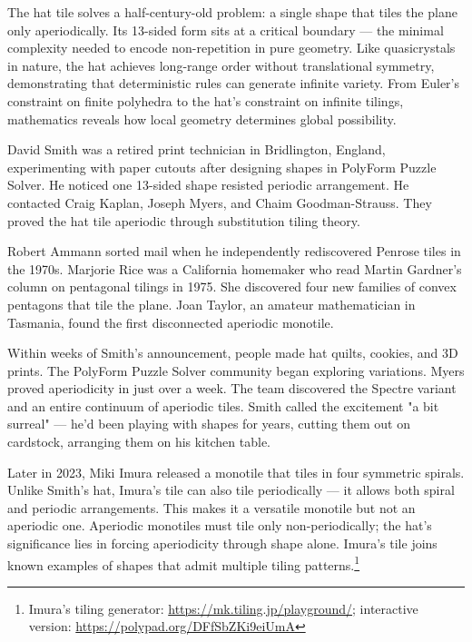 The hat tile solves a half-century-old problem: a single shape that tiles the plane only aperiodically. Its 13-sided form sits at a critical boundary — the minimal complexity needed to encode non-repetition in pure geometry. Like quasicrystals in nature, the hat achieves long-range order without translational symmetry, demonstrating that deterministic rules can generate infinite variety. From Euler's constraint on finite polyhedra to the hat's constraint on infinite tilings, mathematics reveals how local geometry determines global possibility.

\begin{commentary}
David Smith was a retired print technician in Bridlington, England, experimenting with paper cutouts after designing shapes in PolyForm Puzzle Solver. He noticed one 13-sided shape resisted periodic arrangement. He contacted Craig Kaplan, Joseph Myers, and Chaim Goodman-Strauss. They proved the hat tile aperiodic through substitution tiling theory.

Robert Ammann sorted mail when he independently rediscovered Penrose tiles in the 1970s. Marjorie Rice was a California homemaker who read Martin Gardner's column on pentagonal tilings in 1975. She discovered four new families of convex pentagons that tile the plane. Joan Taylor, an amateur mathematician in Tasmania, found the first disconnected aperiodic monotile.

Within weeks of Smith's announcement, people made hat quilts, cookies, and 3D prints. The PolyForm Puzzle Solver community began exploring variations. Myers proved aperiodicity in just over a week. The team discovered the Spectre variant and an entire continuum of aperiodic tiles. Smith called the excitement "a bit surreal" — he'd been playing with shapes for years, cutting them out on cardstock, arranging them on his kitchen table. 

Later in 2023, Miki Imura released a monotile that tiles in four symmetric spirals. Unlike Smith's hat, Imura's tile can also tile periodically — it allows both spiral and periodic arrangements. This makes it a versatile monotile but not an aperiodic one. Aperiodic monotiles must tile only non-periodically; the hat's significance lies in forcing aperiodicity through shape alone. Imura's tile joins known examples of shapes that admit multiple tiling patterns.\footnote{Imura's tiling generator: \url{https://mk.tiling.jp/playground/}; interactive version: \url{https://polypad.org/DFfSbZKi9eiUmA}}

\end{commentary}


